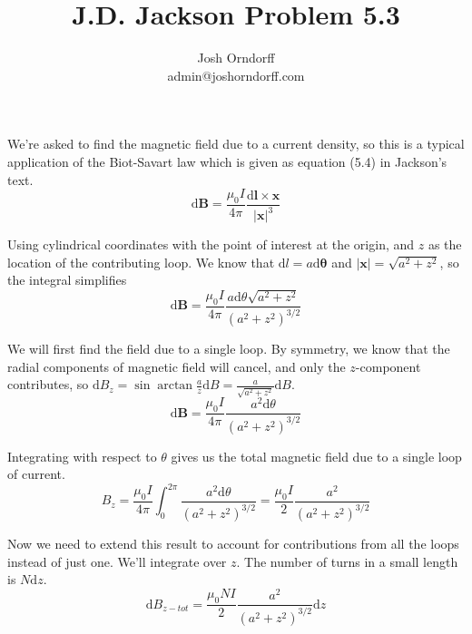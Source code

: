 \documentclass[10pt,a4paper]{article}
\begin{document}
\title{J.D. Jackson Problem 5.3}
\author{Josh Orndorff \\ admin@joshorndorff.com}
\maketitle

We're asked to find the magnetic field due to a current density, so this is a typical application of the Biot-Savart law which is given as equation (5.4) in Jackson's text.
\begin{equation}
\mathrm{d}\mathbf{B}=\frac{\mu_0 I}{4\pi}\frac{\mathrm{d}\mathbf{l}\times\mathbf{x}}{|\mathbf{x}|^3}
\end{equation}

Using cylindrical coordinates with the point of interest at the origin, and $z$ as the location of the contributing loop.  We know that $\mathrm{d}l=a\mathrm{d}\mathbf{\theta}$ and $|\mathbf{x}|=\sqrt{a^2+z^2}$, so the integral simplifies
\begin{equation}
\mathrm{d}\mathbf{B}=\frac{\mu_0 I}{4\pi}\frac{a\mathrm{d}\theta\sqrt{a^2+z^2}}{(a^2+z^2)^{3/2}}
\end{equation}

We will first find the field due to a single loop.  By symmetry, we know that the radial components of magnetic field will cancel, and only the $z$-component contributes, so $\mathrm{d}B_z=\sin\arctan\frac{a}{z}\mathrm{d}B=\frac{a}{\sqrt{a^2+z^2}}\mathrm{d}B$.
\begin{equation}
\mathrm{d}\mathbf{B}=\frac{\mu_0 I}{4\pi}\frac{a^2\mathrm{d}\theta}{(a^2+z^2)^{3/2}}
\end{equation}

Integrating with respect to $\theta$ gives us the total magnetic field due to a single loop of current.
\begin{equation}
B_z=\frac{\mu_0 I}{4\pi}\int_0^{2\pi}\frac{a^2\mathrm{d}\theta}{(a^2+z^2)^{3/2}}=\frac{\mu_0I}{2}\frac{a^2}{(a^2+z^2)^{3/2}}
\end{equation}

Now we need to extend this result to account for contributions from all the loops instead of just one.  We'll integrate over $z$.  The number of turns in a small length is $N\mathrm{d}z$.
\begin{equation}
\mathrm{d}B_{z-tot}=\frac{\mu_0NI}{2}\frac{a^2}{(a^2+z^2)^{3/2}}\mathrm{d}z
\end{equation}
\end{document}
